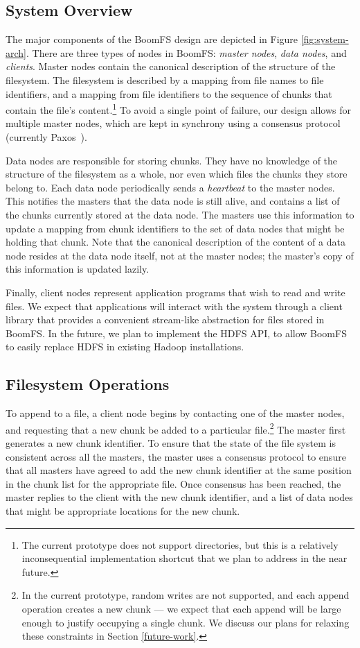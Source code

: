 \documentclass{article}
\begin{document}
\subsection{System Overview}
The major components of the BoomFS design are depicted in Figure
\ref{fig:system-arch}. There are three types of nodes in BoomFS:
\emph{master nodes}, \emph{data nodes}, and \emph{clients}. Master
nodes contain the canonical description of the structure of the
filesystem. The filesystem is described by a mapping from file names
to file identifiers, and a mapping from file identifiers to the
sequence of chunks that contain the file's content.\footnote{The
  current prototype does not support directories, but this is a
  relatively inconsequential implementation shortcut that we plan to
  address in the near future.} To avoid a single point of failure, our
design allows for multiple master nodes, which are kept in synchrony
using a consensus protocol (currently Paxos~\cite{paxos-made-simple}).

Data nodes are responsible for storing chunks. They have no knowledge
of the structure of the filesystem as a whole, nor even which files
the chunks they store belong to. Each data node periodically sends a
\emph{heartbeat} to the master nodes. This notifies the masters that
the data node is still alive, and contains a list of the chunks
currently stored at the data node. The masters use this information to
update a mapping from chunk identifiers to the set of data nodes that
might be holding that chunk. Note that the canonical description of
the content of a data node resides at the data node itself, not at the
master nodes; the master's copy of this information is updated lazily.

Finally, client nodes represent application programs that wish to read
and write files. We expect that applications will interact with the
system through a client library that provides a convenient stream-like
abstraction for files stored in BoomFS. In the future, we plan to
implement the HDFS API, to allow BoomFS to easily replace HDFS in
existing Hadoop installations. %

\subsection{Filesystem Operations}
\label{fs-ops}
To append to a file, a client node begins by contacting one of the
master nodes, and requesting that a new chunk be added to a particular
file.\footnote{In the current prototype, random writes are not
  supported, and each append operation creates a new chunk --- we
  expect that each append will be large enough to justify occupying a
  single chunk. We discuss our plans for relaxing these constraints in
  Section \ref{future-work}.} The master first generates a new chunk
identifier. To ensure that the state of the file system is consistent
across all the masters, the master uses a consensus protocol to ensure
that all masters have agreed to add the new chunk identifier at the
same position in the chunk list for the appropriate file. Once
consensus has been reached, the master replies to the client with the
new chunk identifier, and a list of data nodes that might be
appropriate locations for the new chunk.
\end{document}
